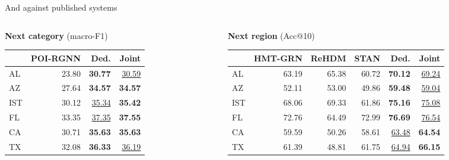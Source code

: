 \documentclass{beamer}
\begin{document}
\begin{frame}{And against published systems}
    \vspace{0pt}%
    {\footnotesize\setlength{\tabcolsep}{2.4pt}
    \begin{columns}[T,onlytextwidth]
    \begin{column}{0.37\textwidth}
        \centering \textbf{Next category} (macro-F1)\\[1mm]
        \begin{tabular}{@{}lrrr@{}}
            \toprule & POI-RGNN & Ded. & Joint \\ \midrule
            AL  & 23.80 & \textbf{30.77} & \underline{30.59} \\
            AZ  & 27.64 & \textbf{34.57} & \textbf{34.57} \\
            IST & 30.12 & \underline{35.34} & \textbf{35.42} \\
            FL  & 33.35 & \underline{37.35} & \textbf{37.55} \\
            CA  & 30.71 & \textbf{35.63} & \textbf{35.63} \\
            TX  & 32.08 & \textbf{36.33} & \underline{36.19} \\
            \bottomrule
        \end{tabular}
    \end{column}
    \begin{column}{0.61\textwidth}
        \centering \textbf{Next region} (Acc@10)\\[1mm]
        \begin{tabular}{@{}lrrrrr@{}}
            \toprule & HMT-GRN & ReHDM & STAN & Ded. & Joint \\ \midrule
            AL  & 63.19 & 65.38 & 60.72 & \textbf{70.12} & \underline{69.24} \\
            AZ  & 52.11 & 53.00 & 49.86 & \textbf{59.48} & \underline{59.04} \\
            IST & 68.06 & 69.33 & 61.86 & \textbf{75.16} & \underline{75.08} \\
            FL  & 72.76 & 64.49 & 72.99 & \textbf{76.69} & \underline{76.54} \\
            CA  & 59.59 & 50.26 & 58.61 & \underline{63.48} & \textbf{64.54} \\
            TX  & 61.39 & 48.81 & 61.75 & \underline{64.94} & \textbf{66.15} \\
            \bottomrule
        \end{tabular}
    \end{column}
    \end{columns}\par}


\end{frame}
\end{document}
